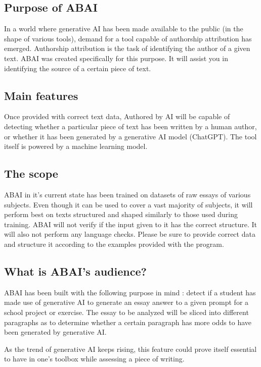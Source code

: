 \subsection{Purpose of ABAI}
In a world where generative AI has been made available to the public (in the shape of various tools), demand for a tool capable of authorship attribution has emerged. Authorship attribution is the task of identifying the author of a given text. ABAI was created specifically for this purpose. It will assist you in identifying the source of a certain piece of text.

\subsection{Main features}
 Once provided with correct text data, Authored by AI will be capable of detecting whether a particular piece of text has been written by a human author, or whether it has been generated by a generative AI model (ChatGPT). The tool itself is powered by a machine learning model.
 
\subsection{The scope}
ABAI in it's current state has been trained on datasets of raw essays of various subjects. Even though it can be used to cover a vast majority of subjects, it will perform best on texts structured and shaped similarly to those used during training. ABAI will not verify if the input given to it has the correct structure. It will also not perform any language checks. Please be sure to provide correct data and structure it according to the examples provided with the program. 

\subsection{What is ABAI's audience?}
ABAI has been built with the following purpose in mind : detect if a student has made use of generative AI to generate an essay answer to a given prompt for a school project or exercise. The essay to be analyzed will be sliced into different paragraphs as to determine whether a certain paragraph has more odds to have been generated by generative AI. \\
\clearpage

As the trend of generative AI keeps rising, this feature could prove itself essential to have in one's toolbox while assessing a piece of writing.\\

